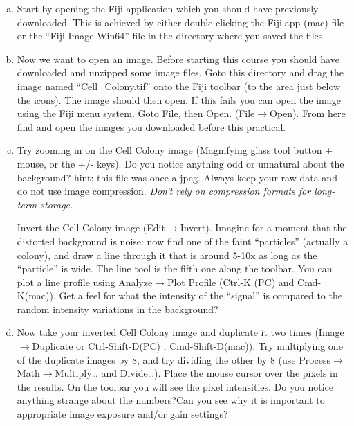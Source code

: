 \documentclass[a4paper,oneside,article]{memoir}
\begin{document}
    \begin{enumerate}[(a)]
      \item Start by opening the Fiji application which you should have
      previously downloaded. This is achieved by either double-clicking
      the Fiji.app (mac) file or the ``Fiji Image Win64'' file in the
      directory where you saved the files.

      \item Now we want to open an image. Before starting this course
      you should have downloaded and unzipped some image files. Goto
      this directory and drag the image named ``Cell\_Colony.tif'' onto
      the Fiji toolbar (to the area just below the icons). The image
      should then open. If this fails you can open the image using the
      Fiji menu system. Goto File, then Open. (File$\rightarrow$Open).
      From here find and open the images you downloaded before this
      practical.

      \item Try zooming in on the Cell Colony image (Magnifying glass
      tool button + mouse, or the +/- keys). Do you notice anything odd
      or unnatural about the background? hint: this file was once a
      jpeg. Always keep your raw data and do not use image compression.
      \emph{Don't rely on compression formats for long-term storage.}

      Invert the Cell Colony image (Edit$\rightarrow$Invert).
      Imagine for a moment that the distorted background is noise: now
      find one of the faint ``particles'' (actually a colony), and draw
      a line through it that is around 5-10x as long as the ``particle''
      is wide. The line tool is the fifth one along the toolbar. You can
      plot a line profile using Analyze$\rightarrow$Plot Profile (Ctrl-K
      (PC) and Cmd-K(mac)). Get a feel for what the intensity of the
      ``signal'' is compared to the random intensity variations in the
      background?

      \item Now take your inverted Cell Colony image and duplicate it
      two times (Image$\rightarrow$Duplicate or Ctrl-Shift-D(PC) ,
      Cmd-Shift-D(mac)). Try multiplying one of the duplicate images
      by 8, and try dividing the other by 8 (use
      Process$\rightarrow$Math$\rightarrow$Multiply\dots{} and
      Divide\dots{}). Place the mouse cursor over the pixels in the
      results. On the toolbar you will see the pixel intensities. Do you
      notice anything strange about the numbers?Can you see why it is
      important to appropriate image exposure and/or gain settings?


\end{enumerate}
\end{document}
